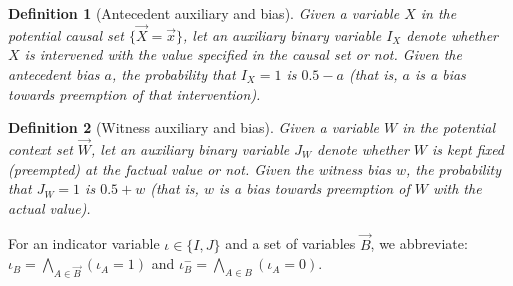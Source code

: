 \documentclass{article}
\newtheorem{definition}{Definition}
\begin{document}
\begin{definition}[Antecedent auxiliary and bias]
    Given a variable \(X\) in the potential causal set \(\{\vec{X} = \vec{x}\}\), let an auxiliary binary variable \(I_X\) denote whether \(X\) is intervened with the value specified in the causal set or not. Given the antecedent bias \(a\), the probability that \(I_X =1\) is \(0.5 - a\) (that is, $a$ is a bias towards preemption of that intervention).
    
\end{definition}

\begin{definition}[Witness auxiliary and bias]
    Given a variable \(W\) in the potential context set \(\vec{W}\), let an auxiliary binary variable \(J_W\) denote whether \(W\) is kept fixed (preempted) at the factual value or not. Given the witness  bias \(w\), the probability that \(J_W=1\)  is \(0.5 + w\) (that is, $w$ is a bias towards preemption of $W$ with the actual value).
\end{definition}

\noindent For an indicator variable $\iota\in \{I, J\}$ and a set of variables \(\vec{B}\), we abbreviate: \(\iota_B = \bigwedge_{A \in \vec{B}} \left(\iota _A = 1 \right)\)    and \(\iota_B^- = \bigwedge_{A\in B} \left(\iota_A = 0\right)\).
\end{document}
